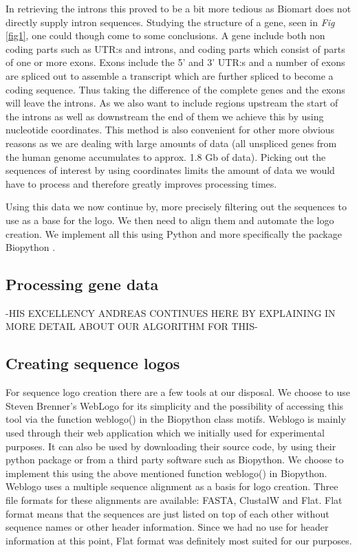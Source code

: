 \documentclass[10pt,letterpaper]{article}
\begin{document}
In retrieving the introns this proved to be a bit more tedious as Biomart does not directly supply intron sequences. Studying the structure of a gene, seen in \textit{Fig} \ref{fig1}, one could though come to some conclusions. A gene include both non coding parts such as UTR:s and introns, and coding parts which consist of parts of one or more exons. Exons include the 5' and 3' UTR:s and a number of exons are spliced out to assemble a transcript which are further spliced to become a coding sequence. Thus taking the difference of the complete genes and the exons will leave the introns. As we also want to include regions upstream the start of the introns as well as downstream the end of them we achieve this by using nucleotide coordinates. This method is also convenient for other more obvious reasons as we are dealing with large amounts of data (all unspliced genes from the human genome accumulates to approx. 1.8 Gb of data). Picking out the sequences of interest by using coordinates limits the amount of data we would have to process and therefore greatly improves processing times.

Using this data we now continue by, more precisely filtering out the sequences to use as a base for the logo. We then need to align them and automate the logo creation. We implement all this using Python and more specifically the package Biopython \cite{bib4}.

\subsection*{Processing gene data}

-HIS EXCELLENCY ANDREAS CONTINUES HERE BY EXPLAINING IN MORE DETAIL ABOUT OUR ALGORITHM FOR THIS-

\subsection*{Creating sequence logos}
For sequence logo creation there are a few tools at our disposal. We choose to use Steven Brenner's WebLogo \cite{bib6} for its simplicity and the possibility of accessing this tool via the function weblogo() in the Biopython class motifs. Weblogo is mainly used through their web application which we initially used for experimental purposes. It can also be used by downloading their source code, by using their python package or from a third party software such as Biopython. We choose to implement this using the above mentioned function weblogo() in Biopython. Weblogo uses a multiple sequence alignment as a basis for logo creation. Three file formats for these alignments are available: FASTA, ClustalW and Flat. Flat format means that the sequences are just listed on top of each other without sequence names or other header information. Since we had no use for header information at this point, Flat format was definitely most suited for our purposes. 
\end{document}
